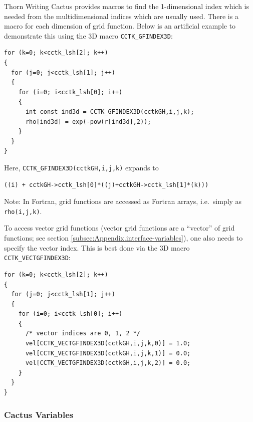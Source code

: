 \begin{cactuspart}{Thorn Writing}
Cactus provides
macros to find the 1-dimensional index which is needed from the multidimensional
indices which are usually used. There is a macro for each dimension of
grid function.  Below is an artificial example to demonstrate this
using the 3D macro \texttt{CCTK\_GFINDEX3D}:
\begin{verbatim}
for (k=0; k<cctk_lsh[2]; k++)
{
  for (j=0; j<cctk_lsh[1]; j++)
  {
    for (i=0; i<cctk_lsh[0]; i++)
    {
      int const ind3d = CCTK_GFINDEX3D(cctkGH,i,j,k);
      rho[ind3d] = exp(-pow(r[ind3d],2));
    }
  }
}
\end{verbatim}
%
Here, \verb|CCTK_GFINDEX3D(cctkGH,i,j,k)| expands to
\begin{verbatim}
((i) + cctkGH->cctk_lsh[0]*((j)+cctkGH->cctk_lsh[1]*(k)))
\end{verbatim}
%
Note: In Fortran, grid functions are accessed as Fortran arrays,
i.e.\ simply as \verb|rho(i,j,k)|.

To access vector grid functions (vector grid functions are a
``vector'' of grid functions; see section
\ref{subsec:Appendix.interface-variables}), one also needs to specify
the vector index. This is best done via the 3D macro
\texttt{CCTK\_VECTGFINDEX3D}:
\begin{verbatim}
for (k=0; k<cctk_lsh[2]; k++)
{
  for (j=0; j<cctk_lsh[1]; j++)
  {
    for (i=0; i<cctk_lsh[0]; i++)
    {
      /* vector indices are 0, 1, 2 */
      vel[CCTK_VECTGFINDEX3D(cctkGH,i,j,k,0)] = 1.0;
      vel[CCTK_VECTGFINDEX3D(cctkGH,i,j,k,1)] = 0.0;
      vel[CCTK_VECTGFINDEX3D(cctkGH,i,j,k,2)] = 0.0;
    }
  }
}
\end{verbatim}

\subsubsection{Cactus Variables}
\label{sec:cactus_variables_c}


\end{cactuspart}
